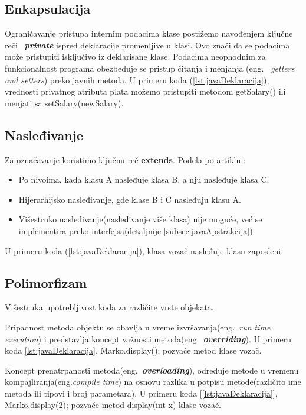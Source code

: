 \documentclass[a4paper]{article}
\begin{document}
\subsection{Enkapsulacija}
\label{subsec:javaEnkapsulacija}

Ograničavanje pristupa internim podacima klase postižemo navođenjem ključne reči ~{\em \textbf{private}} ispred deklaracije promenljive u klasi. Ovo znači da se podacima može pristupiti isključivo iz deklarisane klase. Podacima neophodnim za funkcionalnost programa obezbeđuje se pristup čitanja i menjanja (eng. ~{\em getters and setters})\cite{horstmann2017core} preko javnih metoda. U primeru koda (\ref{lst:javaDeklaracija}), vrednosti privatnog atributa plata možemo pristupiti metodom getSalary() ili menjati sa setSalary(newSalary).

\subsection{Nasleđivanje}
\label{subsec:javaNasledjivanje}

Za označavanje koristimo ključnu reč \textbf{extends}. Podela po artiklu \cite{oopJava}:
\begin{itemize}
  \item Po nivoima, kada klasu A nasleđuje klasa B, a nju nasleđuje klasa C.
  \item Hijerarhijsko nasleđivanje, gde klase B i C nasleđuju klasu A.
  \item Višestruko nasleđivanje(nasleđivanje više klasa) nije moguće, već se implementira preko interfejsa(detaljnije \ref{subsec:javaApstrakcija}).
\end{itemize}
U primeru koda (\ref{lst:javaDeklaracija}), klasa vozač nasleđuje klasu zaposleni.

\subsection{Polimorfizam}
\label{subsec:javaPolimorfizam}

Višestruka upotrebljivost koda za različite vrste objekata.

Pripadnost metoda objektu  se obavlja u vreme izvršavanja(eng.~{\em run time execution}) i predstavlja koncept važnosti metoda(eng.~{\em\textbf{overriding}})\cite{horstmann2017core}. U primeru koda \ref{lst:javaDeklaracija}, Marko.display(); pozvaće metod klase vozač. 

Koncept prenatrpanosti metoda(eng.~{\em\textbf{overloading}})\cite{horstmann2017core}, određuje metode u vremenu kompajliranja(eng.{\em compile time}) na osnovu razlika u potpisu metode(različito ime metoda ili tipovi i broj parametara). U primeru koda [\ref{lst:javaDeklaracija}], Marko.display(2); pozvaće metod display(int x) klase vozač.
\end{document}
